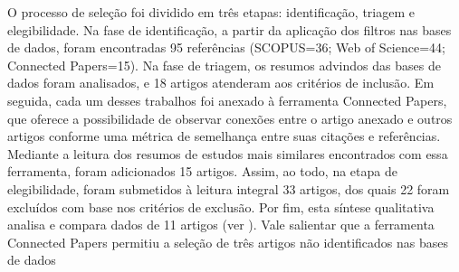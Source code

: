 \documentclass[portuguese]{textolivre}
\begin{document}
O processo de seleção foi dividido em três etapas: identificação, triagem e elegibilidade. Na fase de identificação, a partir da aplicação dos filtros nas bases de dados, foram encontradas 95 referências (SCOPUS=36; Web of Science=44; Connected Papers=15). Na fase de triagem, os resumos advindos das bases de dados foram analisados, e 18 artigos atenderam aos critérios de inclusão. Em seguida, cada um desses trabalhos foi anexado à ferramenta Connected Papers, que oferece a possibilidade de observar conexões entre o artigo anexado e outros artigos conforme uma métrica de semelhança entre suas citações e referências. Mediante a leitura dos resumos de estudos mais similares encontrados com essa ferramenta, foram adicionados 15 artigos. Assim, ao todo, na etapa de elegibilidade, foram submetidos à leitura integral 33 artigos, dos quais 22 foram excluídos com base nos critérios de exclusão. Por fim, esta síntese qualitativa analisa e compara dados de 11 artigos (ver ). Vale salientar que a ferramenta Connected Papers permitiu a seleção de três artigos não identificados nas bases de dados \cite{marini_impact_2021, noyes_effect_2021, ruba_childrens_2020}
\end{document}
